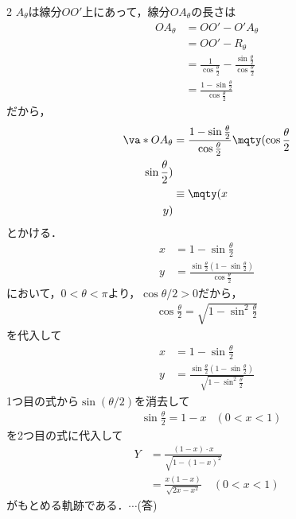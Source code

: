 \documentclass[../../main.tex]{subfiles}
\begin{document}
\begin{multicols}{2}
  $A_{\theta}$は線分$OO'$上にあって，線分$OA_{\theta}$の長さは
  \begin{align*}
    OA_{\theta}
     & = OO' - O'A_{\theta}                                                                  \\
     & = OO' - R_{\theta}                                                                    \\
     & = \frac{1}{\cos\frac{\theta}{2}} -  \frac{\sin\frac{\theta}{2}}{\cos\frac{\theta}{2}} \\
     & = \frac{1-\sin\frac{\theta}{2}}{\cos\frac{\theta}{2}}
  \end{align*}
  だから，
  \begin{align*}
    \va*{OA_{\theta}}
     & =  \frac{1-\sin\frac{\theta}{2}}{\cos\frac{\theta}{2}} \mqty(\cos\frac{\theta}{2} \\ \sin\frac{\theta}{2}) \\
     & \equiv \mqty(x                                                                    \\ y)
  \end{align*}
  とかける．
  \begin{align}
    x & = 1-\sin\frac{\theta}{2}                                                               \\
    y & = \frac{\sin\frac{\theta}{2}\left(1-\sin\frac{\theta}{2}\right)}{\cos\frac{\theta}{2}}
  \end{align}
  において，$0<\theta<\pi$より，$\cos\theta/2>0$だから，
  \begin{align}
    \cos\frac{\theta}{2} = \sqrt{1-\sin^2\frac{\theta}{2}}
  \end{align}
  を代入して
  \begin{align}
    x & = 1-\sin\frac{\theta}{2}                                                                          \\
    y & = \frac{\sin\frac{\theta}{2}\left(1-\sin\frac{\theta}{2}\right)}{\sqrt{1-\sin^2\frac{\theta}{2}}}
  \end{align}
  1つ目の式から$\sin(\theta/2)$を消去して
  \begin{align*}
     & \sin\frac{\theta}{2} = 1-x & (0<x<1)
  \end{align*}
  を2つ目の式に代入して
  \begin{align*}
    Y
     & = \frac{(1-x)\cdot x}{\sqrt{1-(1-x)^2}}      \\
     & = \frac{x(1-x)}{\sqrt{2x-x^2}} \quad (0<x<1)
  \end{align*}
  がもとめる軌跡である．$\cdots$(答)


\end{multicols}
\end{document}
